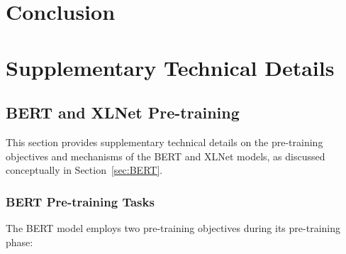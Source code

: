 \documentclass[10pt,oneside]{report}
\renewcommand{\small}{\fontsize{7}{8}\selectfont}
\begin{document}
\chapter{Conclusion}



% 
\clearpage
\begin{multicols}{2} 
\small

\end{multicols}


\appendix
\chapter{Supplementary Technical Details}

\section{BERT and XLNet Pre-training}\label{app:bert_xlnet_details}

This section provides supplementary technical details on the pre-training objectives and mechanisms of the BERT and XLNet models, as discussed conceptually in Section~\ref{sec:BERT}.

\subsection{BERT Pre-training Tasks}

The BERT model \cite{devlin2019bert} employs two pre-training objectives during its pre-training phase:
\end{document}
